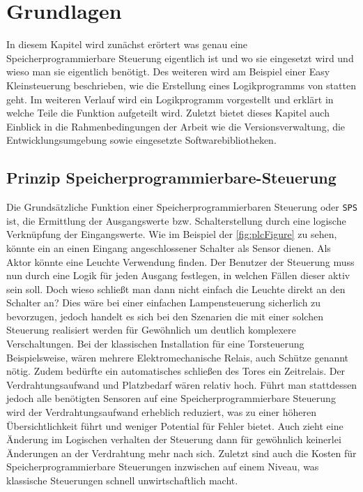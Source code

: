 \section{Grundlagen}\label{kap:grund}
In diesem Kapitel wird zunächst erörtert was genau eine Speicherprogrammierbare Steuerung eigentlich ist und wo sie eingesetzt wird und wieso man sie eigentlich benötigt. Des weiteren wird am Beispiel einer Easy Kleinsteuerung beschrieben, wie die Erstellung eines Logikprogramms von statten geht. Im weiteren Verlauf wird ein Logikprogramm vorgestellt und erklärt in welche Teile die Funktion aufgeteilt wird. Zuletzt bietet dieses Kapitel auch Einblick in die Rahmenbedingungen der Arbeit wie die Versionsverwaltung, die Entwicklungsumgebung sowie eingesetzte Softwarebibliotheken. 
\subsection{Prinzip Speicherprogrammierbare-Steuerung}
Die Grundsätzliche Funktion einer Speicherprogrammierbaren Steuerung oder \texttt{SPS} ist, die Ermittlung der Ausgangswerte bzw. Schalterstellung durch eine logische Verknüpfung der Eingangswerte.\cite{BOOK:SPS} Wie im Beispiel der \autoref{fig:plcFigure} zu sehen, könnte ein an einen Eingang angeschlossener Schalter als Sensor dienen. Als Aktor könnte eine Leuchte Verwendung finden. Der Benutzer der Steuerung muss nun durch eine Logik für jeden Ausgang festlegen, in welchen Fällen dieser aktiv sein soll. Doch wieso schließt man dann nicht einfach die Leuchte direkt an den Schalter an? Dies wäre bei einer einfachen Lampensteuerung sicherlich zu bevorzugen, jedoch handelt es sich bei den Szenarien die mit einer solchen Steuerung realisiert werden für Gewöhnlich um deutlich komplexere Verschaltungen. Bei der klassischen Installation für eine Torsteuerung Beispielsweise, wären mehrere Elektromechanische Relais, auch Schütze genannt nötig. Zudem bedürfte ein automatisches schließen des Tores ein Zeitrelais. Der Verdrahtungsaufwand und Platzbedarf wären relativ hoch. Führt man stattdessen jedoch alle benötigten Sensoren auf eine Speicherprogrammierbare Steuerung wird der Verdrahtungsaufwand erheblich reduziert, was zu einer höheren Übersichtlichkeit führt und weniger Potential für Fehler bietet. Auch zieht eine Änderung im Logischen verhalten der Steuerung dann für gewöhnlich keinerlei Änderungen an der Verdrahtung mehr nach sich. Zuletzt sind auch die Kosten für Speicherprogrammierbare Steuerungen inzwischen auf einem Niveau, was klassische Steuerungen schnell unwirtschaftlich macht. 

